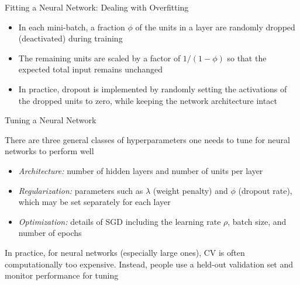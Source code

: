 \documentclass[aspectratio=1610,12pt,xcolor=dvipsnames]{beamer}
\begin{document}
\begin{frame}{Fitting a Neural Network: Dealing with Overfitting}

\begin{itemize}
    \item In each mini-batch, a fraction $\phi$ of the units in a layer are randomly dropped (deactivated) during training
    \item The remaining units are scaled by a factor of $1/(1-\phi)$ so that the expected total input remains unchanged
    \item In practice, dropout is implemented by randomly setting the activations of the dropped units to zero, while keeping the network architecture intact
\end{itemize}

\end{frame}

\begin{frame}{Tuning a Neural Network}

There are three general classes of hyperparameters one needs to tune for neural networks to perform well

\begin{itemize}
    \item \textit{Architecture:} number of hidden layers and number of units per layer
    \item \textit{Regularization:} parameters such as $\lambda$ (weight penalty) and $\phi$ (dropout rate), which may be set separately for each layer
    \item \textit{Optimization:} details of SGD including the learning rate $\rho$, batch size, and number of epochs \pause
\end{itemize}

In practice, for neural networks (especially large ones), CV is often computationally too expensive. Instead, people use a held-out validation set and monitor performance for tuning
\end{frame}
\end{document}
